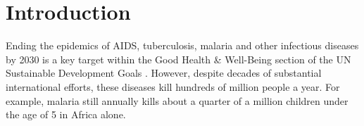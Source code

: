 \documentclass{article}
\begin{document}
\begin{abstract}
%
\end{abstract}

\section{Introduction}
Ending the epidemics of AIDS, tuberculosis, malaria and other infectious diseases by 2030 is a key target within the Good Health \& Well-Being section of the UN Sustainable Development Goals \cite{unitednations,un_sustainable2018}. 
However, despite decades of substantial international efforts, these diseases kill hundreds of million people a year.
For example, malaria still annually kills about a quarter of a million children under the age of 5 in Africa alone.


\end{document}
